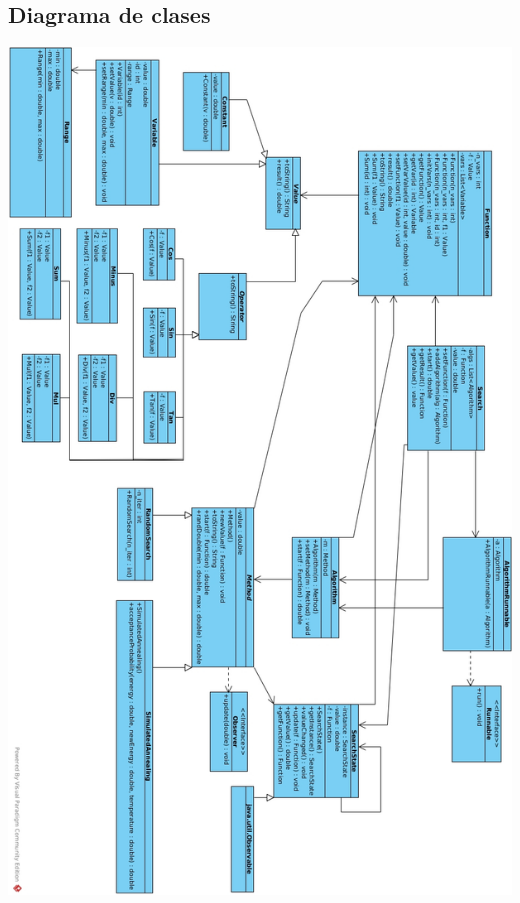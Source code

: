\documentclass{article}
\theoremstyle{definition}
\theoremstyle{remark}
\begin{document}
\subsection{Diagrama de clases}
\includegraphics[scale=0.4]{diagram.jpg}


\newpage
\end{document}
